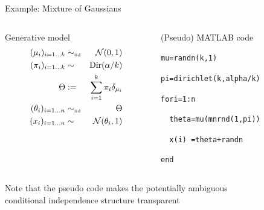 \begin{frame}{Example: Mixture of Gaussians}
  \begin{columns}
    \begin{column}{.47\textwidth}
      \begin{block}{Generative model}
        \begin{eqnarray*}
          (\mu_i)_{i=1\ldots k} & \sim_{\mbox{\tiny iid}} & \mathcal{N}(0, 1) \\
          (\pi_i)_{i=1\ldots k} & \sim & \textrm{Dir}(\alpha/k) \\
          \Theta & := & \sum_{i=1}^k \pi_i \delta_{\mu_i} \\
          (\theta_i)_{i=1\ldots n} & \sim_{\mbox{\tiny iid}} & \Theta \\
          (x_i)_{i=1\ldots n} & \sim & \mathcal{N}(\theta_i, 1)
        \end{eqnarray*}
      \end{block}
    \end{column}
    \begin{column}{.47\textwidth}
      \begin{block}{(Pseudo) MATLAB code}
        \vspace{0.75\baselineskip}
        \begin{alltt}
          mu = randn(k,1)

          pi = dirichlet(k, alpha/k)

          for i = 1:n
            
          \ \ theta = mu(mnrnd(1,pi))
          
          \ \ x(i) \ = theta + randn
            
          end
        \end{alltt}
        \vspace{0.75\baselineskip}
      \end{block}
    \end{column}
  \end{columns}
  \vspace{\baselineskip}
  \begin{center}
  {
    {Note that the pseudo code makes the potentially ambiguous\\conditional independence structure transparent}
  }	
  \end{center}
  \vspace{-1\baselineskip}
\end{frame}

